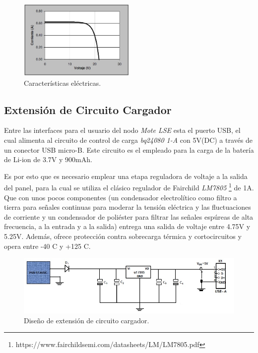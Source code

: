 \begin{figure}[h!]
	\centering
    \includegraphics[width=0.5\textwidth]{./Figures/curva.JPG}
    	\caption{Características eléctricas.}
	\label{fig:curva}
\end{figure}

\subsection{Extensión de Circuito Cargador}
\label{subsec:extensión}
Entre las interfaces para el usuario del nodo \textit{Mote LSE} esta el puerto USB, el cual alimenta al circuito de control de carga \textit{bq24080 1-A} con 5V(DC) a través de un conector USB micro-B. Este circuito es el empleado para la carga de la batería de Li-ion de 3.7V y 900mAh.

Es por esto que es necesario emplear una etapa reguladora de voltaje a la salida del panel, para la cual se utiliza el clásico regulador de Fairchild \textit{LM7805} \footnote{https://www.fairchildsemi.com/datasheets/LM/LM7805.pdf} de 1A. Que con unos pocos componentes (un condensador electrolítico como filtro a tierra para señales continuas para moderar la tensión eléctrica y las fluctuaciones de corriente y un condensador de poliéster para filtrar las señales espúreas de alta frecuencia, a la entrada y a la salida) entrega una salida de voltaje entre 4.75V y 5.25V. Además, ofrece protección contra sobrecarga térmica y cortocircuitos y opera entre -40 \grados C y +125 \grados C.

\begin{figure}[h!]
	\centering
    \includegraphics[width=1\textwidth]{./Figures/circuito.jpg}
    	\caption{Diseño de extensión de circuito cargador.}
	\label{fig:circuito}
\end{figure}

